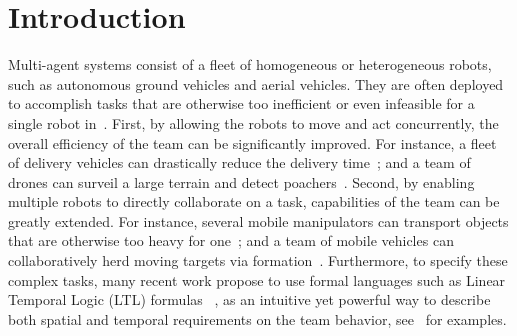 \section{Introduction}\label{sec:introduction}
Multi-agent systems consist of a fleet of homogeneous or heterogeneous robots,
such as autonomous ground vehicles and aerial vehicles.
They are often deployed to accomplish tasks that are otherwise too inefficient or even infeasible for a single robot in~\citep{arai2002advances}.
First,
by allowing the robots to move and act concurrently,
the overall efficiency of the team can be significantly improved.
For instance,
a fleet of delivery vehicles can drastically reduce the delivery time~\citep{toth2002overview};
and a team of drones can surveil a large terrain and detect poachers~\citep{cliff2015online}.
Second,
by enabling multiple robots to directly collaborate on a task,
capabilities of the team can be greatly extended.
For instance,
several mobile manipulators can transport objects that are otherwise too heavy for one~\citep{fink2008multi};
and a team of mobile vehicles can collaboratively herd moving targets via formation~\citep{varava2017herding}.
Furthermore, to specify these complex tasks,
many recent work propose to use formal languages such as Linear Temporal Logic (LTL)
formulas ~\citep{baier2008principles}, as an intuitive yet powerful way to describe
both spatial and temporal requirements on the team behavior,
see~\citep{ulusoy2013optimality, kantaros2020stylus, schillinger2018simultaneous, guo2018multirobot} for examples.


